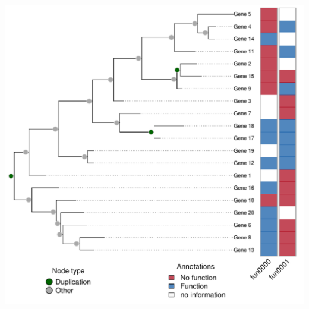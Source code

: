 \documentclass[aspectratio=169, 10pt]{beamer}\usepackage[]{graphicx}\usepackage[]{color}
\newenvironment{knitrout}{}{} %
\begin{document}
\begin{frame}

\begin{knitrout}
\color{fgcolor}

{\centering \includegraphics[width=.6\linewidth]{figure/random-tree-1} 

}



\end{knitrout}


\end{frame}
\end{document}

